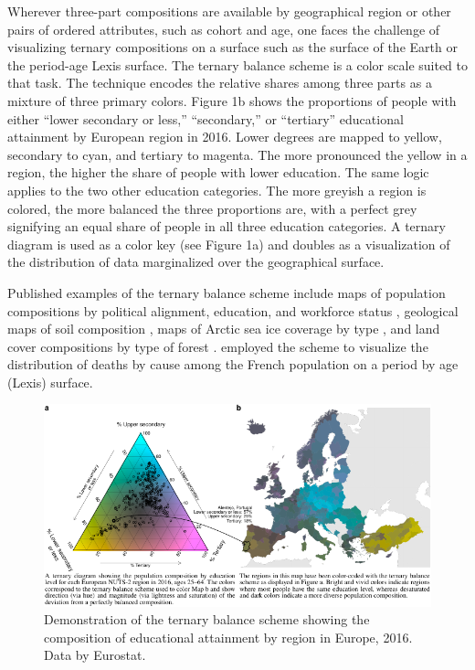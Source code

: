 \documentclass[10pt,twoside,reqno]{article}
\makeatletter
\def\cnstmaxfigwidth{
      \ifdim \Gin@nat@width>\linewidth
        \linewidth
      \else \Gin@nat@width
      \fi
    }
\let\Oldincludegraphics\includegraphics
\renewcommand{\includegraphics}[1]{\Oldincludegraphics[width=\cnstmaxfigwidth]{#1}}
\makeatother
\begin{document}
Wherever three-part compositions are available by geographical region or
other pairs of ordered attributes, such as cohort and age, one faces the
challenge of visualizing ternary compositions on a surface such as the
surface of the Earth or the period-age Lexis surface. The ternary
balance scheme \citep{Brewer1994} is a color scale suited to that task.
The technique encodes the relative shares among three parts as a mixture
of three primary colors. Figure 1b shows the proportions of people with
either ``lower secondary or less,'' ``secondary,'' or ``tertiary''
educational attainment by European region in 2016. Lower degrees are
mapped to yellow, secondary to cyan, and tertiary to magenta. The more
pronounced the yellow in a region, the higher the share of people with
lower education. The same logic applies to the two other education
categories. The more greyish a region is colored, the more balanced the
three proportions are, with a perfect grey signifying an equal share of
people in all three education categories. A ternary diagram is used as a
color key (see Figure 1a) and doubles as a visualization of the
distribution of data marginalized over the geographical surface.

Published examples of the ternary balance scheme include maps of
population compositions by political alignment, education, and workforce
status \citep{Dorling2012, Graetz2019, Brewer1994}, geological maps of
soil composition \citep{Metternicht2003}, maps of Arctic sea ice
coverage by type \citep{Denil2015}, and land cover compositions by type
of forest \citep{Pirzamanbein2020, Steidinger2019}. \citet{Schoeley2017}
employed the scheme to visualize the distribution of deaths by cause
among the French population on a period by age (Lexis) surface.

\begin{figure}
\centering
\includegraphics{figure1.pdf}
\caption{Demonstration of the ternary balance scheme showing the
composition of educational attainment by region in Europe, 2016. Data by
Eurostat.}
\end{figure}
\end{document}
